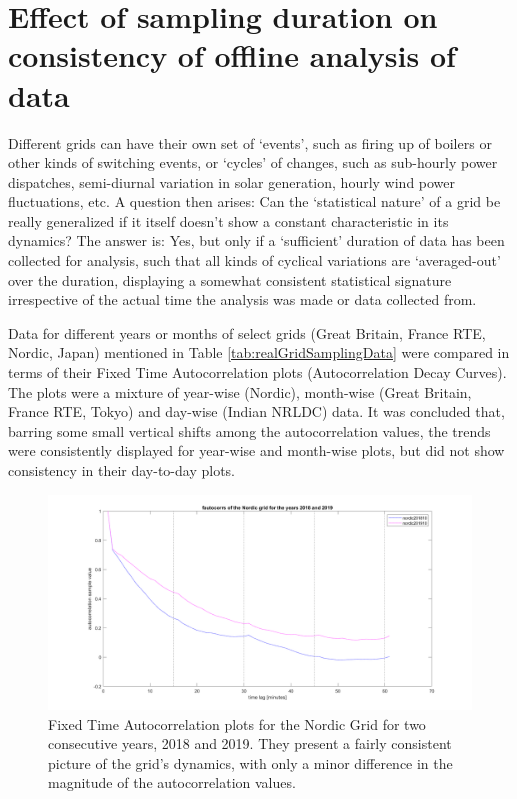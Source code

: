 \appendix

\section{Effect of sampling duration on consistency of offline analysis of data}
\label{app:effectOfSamplingDuration}

Different grids can have their own set of `events', such as firing up of boilers or other kinds of switching events, or `cycles' of changes, such as sub-hourly power dispatches, semi-diurnal variation in solar generation, hourly wind power fluctuations, etc. A question then arises: Can the `statistical nature' of a grid be really generalized if it itself doesn't show a constant characteristic in its dynamics? The answer is: Yes, but only if a `sufficient' duration of data has been collected for analysis, such that all kinds of cyclical variations are `averaged-out' over the duration, displaying a somewhat consistent statistical signature irrespective of the actual time the analysis was made or data collected from.

Data for different years or months of select grids (Great Britain, France RTE, Nordic, Japan) mentioned in Table \ref{tab:realGridSamplingData} were compared in terms of their Fixed Time Autocorrelation plots (Autocorrelation Decay Curves). The plots were a mixture of year-wise (Nordic), month-wise (Great Britain, France RTE, Tokyo) and day-wise (Indian NRLDC) data. It was concluded that, barring some small vertical shifts among the autocorrelation values, the trends were consistently displayed for year-wise and month-wise plots, but did not show consistency in their day-to-day plots. 

\begin{figure}[!ht]
	\includegraphics[scale=0.25]{../figures/autocorr/fautocorrs_nordic_201801_to_201912}
	\caption{Fixed Time Autocorrelation plots for the Nordic Grid for two consecutive years, 2018 and 2019. They present a fairly consistent picture of the grid's dynamics, with only a minor difference in the magnitude of the autocorrelation values.}
\end{figure}


